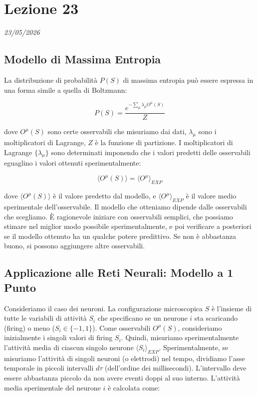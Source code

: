 \chapter{Lezione 23}
\label{capitolo_23}
\textit{23/05/2026}

\section{Modello di Massima Entropia}
La distribuzione di probabilità $P(S)$ di massima entropia può essere espressa in una forma simile a quella di Boltzmann:

\begin{equation} \label{eq:ch23_1}
P(S) = \frac{e^{-\sum_{\mu} \lambda_{\mu} O^{\mu}(S)}}{Z}
\end{equation}

dove $O^{\mu}(S)$ sono certe osservabili che misuriamo dai dati, $\lambda_{\mu}$ sono i moltiplicatori di Lagrange, $Z$ è la funzione di partizione.
I moltiplicatori di Lagrange $\{\lambda_{\mu}\}$ sono determinati imponendo che i valori predetti delle osservabili eguaglino i valori ottenuti sperimentalmente:

\begin{equation} \label{eq:ch23_2}
\langle O^{\mu}(S) \rangle = \langle O^{\mu} \rangle_{EXP}
\end{equation}

dove $\langle O^{\mu}(S) \rangle$ è il valore predetto dal modello, e $\langle O^{\mu} \rangle_{EXP}$ è il valore medio sperimentale dell'osservabile.
Il modello che otteniamo dipende dalle osservabili che scegliamo. È ragionevole iniziare con osservabili semplici, che possiamo stimare nel miglior modo possibile sperimentalmente, e poi verificare a posteriori se il modello ottenuto ha un qualche potere predittivo. Se non è abbastanza buono, si possono aggiungere altre osservabili.


\section{Applicazione alle Reti Neurali: Modello a 1 Punto}
Consideriamo il caso dei neuroni. La configurazione microscopica $S$ è l'insieme di tutte le variabili di attività $S_i$ che specificano se un neurone $i$ sta scaricando (firing) o meno ($S_i \in \{-1,1\}$).
Come osservabili $O^{\mu}(S)$, consideriamo inizialmente i singoli valori di firing $S_i$. Quindi, misuriamo sperimentalmente l'attività media di ciascun singolo neurone $\langle S_i \rangle_{EXP}$.
Sperimentalmente, se misuriamo l'attività di singoli neuroni (o elettrodi) nel tempo, dividiamo l'asse temporale in piccoli intervalli $d\tau$ (dell'ordine dei millisecondi). L'intervallo deve essere abbastanza piccolo da non avere eventi doppi al suo interno.
L'attività media sperimentale del neurone $i$ è calcolata come:

